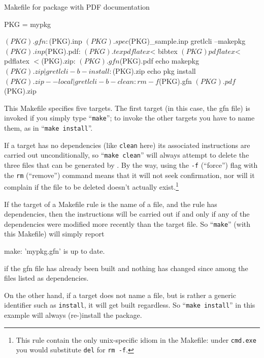 \documentclass[oneside]{book}
\begin{document}
\begin{script}[htbp]
  \caption{Makefile for package with PDF documentation}
  \label{ex:make2}
\begin{scode}
PKG = mypkg

$(PKG).gfn: $(PKG).inp $(PKG).spec $(PKG)_sample.inp
	gretlcli --makepkg $(PKG).inp

$(PKG).pdf: $(PKG).tex
        pdflatex $<
        bibtex $(PKG)
        pdflatex $<
        pdflatex $<

$(PKG).zip: $(PKG).gfn $(PKG).pdf
	echo makepkg $(PKG).zip | gretlcli -b -

install: $(PKG).zip
	echo pkg install $(PKG).zip --local | gretlcli -b -

clean:
	rm -f $(PKG).gfn $(PKG).pdf $(PKG).zip
\end{scode}
\end{script}

This Makefile specifies five targets. The first target (in this case,
the \textsf{gfn} file) is invoked if you simply type
``\texttt{make}''; to invoke the other targets you have to name them,
as in ``\texttt{make install}''.

If a target has no dependencies (like \texttt{clean} here) its
associated instructions are carried out unconditionally, so
``\texttt{make clean}'' will always attempt to delete the three files
that can be generated by .  By the way, using the
\texttt{-f} (``force'') flag with the \texttt{rm} (``remove'') command
means that it will not seek confirmation, nor will it complain if the
file to be deleted doesn't actually exist.\footnote{This rule contain
  the only unix-specific idiom in the Makefile: under \texttt{cmd.exe}
  you would substitute \texttt{del} for \texttt{rm -f}.}

If the target of a Makefile rule is the name of a file, and the rule
has dependencies, then the instructions will be carried out if and
only if any of the dependencies were modified more recently than the
target file.  So ``\texttt{make}'' (with this Makefile) will simply
report
\begin{code}
make: 'mypkg.gfn' is up to date.
\end{code}
if the \textsf{gfn} file has already been built and nothing has
changed since among the files listed as dependencies.

On the other hand, if a target does not name a file, but is rather a
generic identifier such as \texttt{install}, it will get built
regardless. So ``\texttt{make install}'' in this example will always
(re-)install the package.
\end{document}
